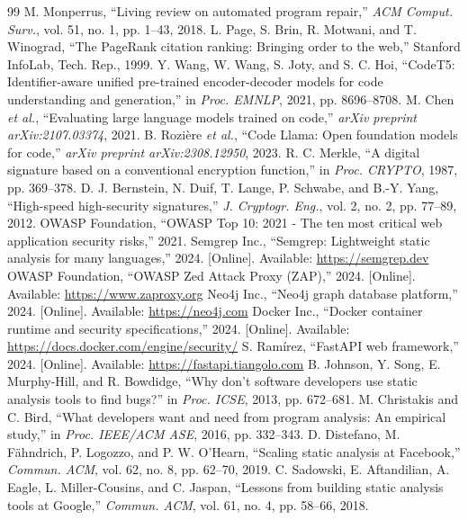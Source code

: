 \documentclass[journal,twoside]{IEEEtran}
\begin{document}
\begin{thebibliography}{99}
 M. Monperrus, ``Living review on automated program repair,'' \emph{ACM Comput. Surv.}, vol. 51, no. 1, pp. 1--43, 2018.
 L. Page, S. Brin, R. Motwani, and T. Winograd, ``The PageRank citation ranking: Bringing order to the web,'' Stanford InfoLab, Tech. Rep., 1999.
 Y. Wang, W. Wang, S. Joty, and S. C. Hoi, ``CodeT5: Identifier-aware unified pre-trained encoder-decoder models for code understanding and generation,'' in \emph{Proc. EMNLP}, 2021, pp. 8696--8708.
 M. Chen \emph{et al.}, ``Evaluating large language models trained on code,'' \emph{arXiv preprint arXiv:2107.03374}, 2021.
 B. Rozi{\`e}re \emph{et al.}, ``Code Llama: Open foundation models for code,'' \emph{arXiv preprint arXiv:2308.12950}, 2023.
 R. C. Merkle, ``A digital signature based on a conventional encryption function,'' in \emph{Proc. CRYPTO}, 1987, pp. 369--378.
 D. J. Bernstein, N. Duif, T. Lange, P. Schwabe, and B.-Y. Yang, ``High-speed high-security signatures,'' \emph{J. Cryptogr. Eng.}, vol. 2, no. 2, pp. 77--89, 2012.
 OWASP Foundation, ``OWASP Top 10: 2021 - The ten most critical web application security risks,'' 2021.
 Semgrep Inc., ``Semgrep: Lightweight static analysis for many languages,'' 2024. [Online]. Available: \url{https://semgrep.dev}
 OWASP Foundation, ``OWASP Zed Attack Proxy (ZAP),'' 2024. [Online]. Available: \url{https://www.zaproxy.org}
 Neo4j Inc., ``Neo4j graph database platform,'' 2024. [Online]. Available: \url{https://neo4j.com}
 Docker Inc., ``Docker container runtime and security specifications,'' 2024. [Online]. Available: \url{https://docs.docker.com/engine/security/}
 S. Ram{\'i}rez, ``FastAPI web framework,'' 2024. [Online]. Available: \url{https://fastapi.tiangolo.com}
 B. Johnson, Y. Song, E. Murphy-Hill, and R. Bowdidge, ``Why don't software developers use static analysis tools to find bugs?'' in \emph{Proc. ICSE}, 2013, pp. 672--681.
 M. Christakis and C. Bird, ``What developers want and need from program analysis: An empirical study,'' in \emph{Proc. IEEE/ACM ASE}, 2016, pp. 332--343.
 D. Distefano, M. F{\"a}hndrich, P. Logozzo, and P. W. O'Hearn, ``Scaling static analysis at Facebook,'' \emph{Commun. ACM}, vol. 62, no. 8, pp. 62--70, 2019.
 C. Sadowski, E. Aftandilian, A. Eagle, L. Miller-Cousins, and C. Jaspan, ``Lessons from building static analysis tools at Google,'' \emph{Commun. ACM}, vol. 61, no. 4, pp. 58--66, 2018.

\end{thebibliography}
\end{document}
